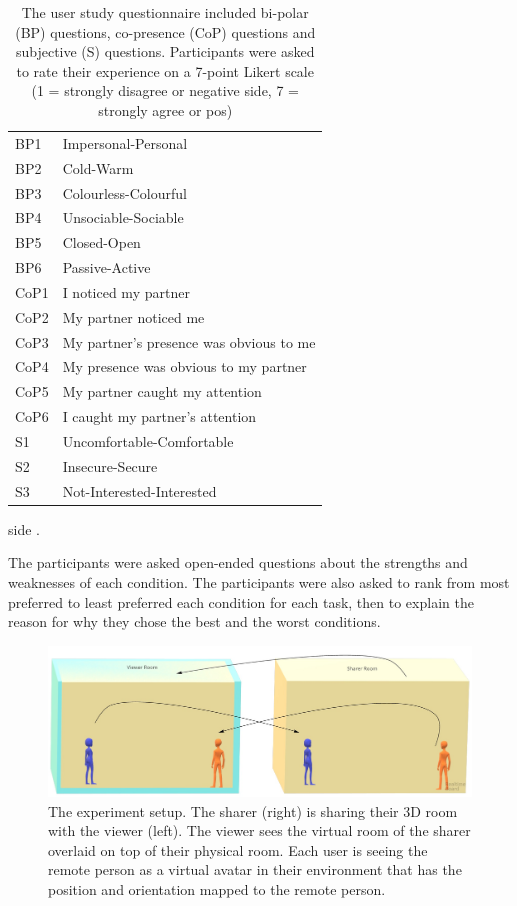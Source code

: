 \begin{table}
    \centering
    \begin{tabular}{ll}
BP1 &    Impersonal-Personal\\
BP2 &    Cold-Warm\\
BP3 &    Colourless-Colourful\\
BP4 &    Unsociable-Sociable\\
BP5 &    Closed-Open\\
BP6 &    Passive-Active\\
CoP1    &   I noticed my partner\\
CoP2    &   My partner noticed me\\
CoP3    &   My partner's presence was obvious to me\\
CoP4    &   My presence was obvious to my partner\\
CoP5    &   My partner caught my attention \\
CoP6    &   I caught my partner's attention\\
S1  & Uncomfortable-Comfortable\\
S2  & Insecure-Secure\\
S3  & Not-Interested-Interested\\
    \end{tabular}
    \caption{The user study questionnaire included bi-polar (BP) questions, co-presence (CoP) questions and subjective (S) questions. Participants were asked to rate their experience on a 7-point Likert scale (1 = strongly disagree or negative side, 7 = strongly agree or pos)}
   side . \label{tabitive:frontier18:questions}
\end{table}

The participants were asked open-ended questions about the strengths and weaknesses of each condition. The participants were also asked to rank from most preferred to least preferred each condition for each task, then to explain the reason for why they chose the best and the worst conditions. 

\begin{figure}
\begin{center}
\includegraphics[width=\linewidth]{images/frontier18/experiment-setup.jpg}
\caption{The experiment setup. The sharer (right) is sharing their 3D room with the viewer (left). The viewer sees the virtual room of the sharer overlaid on top of their physical room. Each user is seeing the remote person as a virtual avatar in their environment that has the position and orientation mapped to the remote person.}\label{fig:frontier18:setup}
\end{center}
\end{figure}

